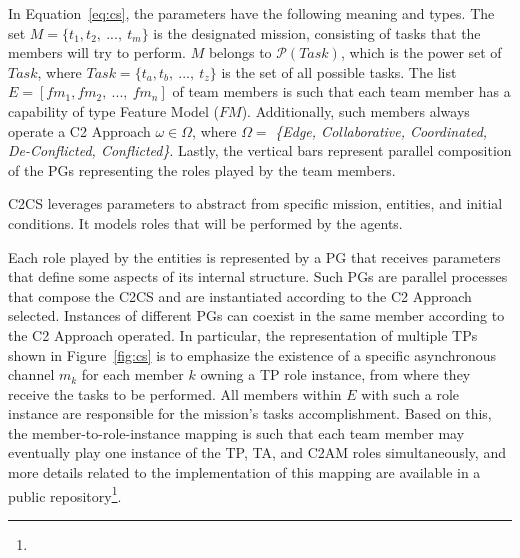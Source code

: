 \color{black}
In Equation~\ref{eq:cs}, the parameters have the following meaning and types. The set $M=\{t_1, t_2,\ ...,\ t_m \}$ is the designated mission, consisting of tasks that the members will try to perform. $M$ belongs to $\mathcal{P}(Task)$, which is the power set of $Task$, where $Task=\{t_a, t_b,\ ...,\ t_z \}$ is the set of all possible tasks. The list $E = [fm_1, fm_2,\ ...,\ fm_n ]$ of team members is such that each team member has a capability of type Feature Model ($FM$). Additionally, such members always operate a C2 Approach $\omega \in \Omega$, where $\Omega =$ \textit{\{Edge, Collaborative, Coordinated, De-Conflicted, Conflicted\}}. Lastly, the vertical bars represent parallel composition of the PGs representing the roles played by the team members.
\color{black}

C2CS leverages parameters to abstract from specific mission, entities, and initial conditions. It models roles that will be performed by the agents.

Each role played by the entities is represented by a PG that receives parameters that define some aspects of its internal structure. Such PGs are parallel processes that compose the C2CS and are instantiated according to the C2 Approach selected. Instances of different PGs can coexist in the same member according to the C2 Approach operated. In particular, the representation of multiple TPs shown in Figure~\ref{fig:cs} is to emphasize the existence of a specific asynchronous channel $m_k$ for each member $k$ owning a TP role instance, from where they receive the tasks to be performed. All members within $E$ with such a role instance are responsible for the mission's tasks accomplishment. Based on this, the member-to-role-instance mapping is such that each team member may eventually play one instance of the TP, TA, and C2AM roles simultaneously, and more details related to the implementation of this mapping are available in a public repository\footnote{\gitRepository}.
   
 

